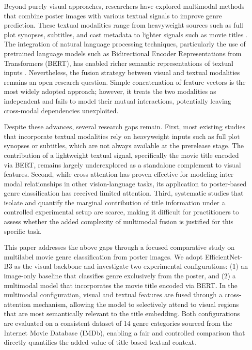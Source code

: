 \documentclass[conference]{IEEEtran}
\begin{document}
Beyond purely visual approaches, researchers have explored multimodal 
methods that combine poster images with various textual signals to 
improve genre prediction. These textual modalities range from 
heavyweight sources such as full plot synopses, subtitles, and cast 
metadata to lighter signals such as movie titles \cite{b5,b6}. 
The integration of natural language processing techniques, particularly 
the use of pretrained language models such as Bidirectional Encoder 
Representations from Transformers (BERT), has enabled richer semantic 
representations of textual inputs \cite{devlin2019}. Nevertheless, the fusion 
strategy between visual and textual modalities remains an open research 
question. Simple concatenation of feature vectors is the most widely 
adopted approach; however, it treats the two modalities as independent 
and fails to model their mutual interactions, potentially leaving 
cross-modal dependencies unexploited.

Despite these advances, several research gaps remain. First, most 
existing studies that incorporate textual modalities rely on heavyweight 
inputs such as full plot synopses or subtitles, which are not always 
available at the prerelease stage. The contribution of a lightweight 
textual signal, specifically the movie title encoded via BERT, 
remains largely underexplored as a standalone complement to visual 
features. Second, while cross-attention has proven effective for 
modeling inter-modal relationships in other vision-language tasks, its 
application to poster-based genre classification has received limited 
attention. Third, systematic studies that isolate and quantify the 
marginal contribution of title information under a controlled 
experimental setup are scarce, making it difficult for practitioners to 
assess whether the added complexity of multimodal fusion is justified 
for this specific task.

This paper addresses the above gaps through a focused comparative study 
on multilabel movie genre classification from poster images. We adopt 
EfficientNet-B3 as the visual backbone and investigate two experimental 
configurations: (1) an image-only baseline that classifies genre 
exclusively from the poster, and (2) a multimodal model that 
incorporates the movie title encoded via BERT. In the multimodal 
configuration, visual and textual features are fused through a 
cross-attention mechanism, allowing the model to selectively attend to 
visual regions that are most semantically relevant to the title 
embedding. Both configurations are evaluated on a consistent dataset 
of 14 genre categories sourced from the Internet Movie Database (IMDb), 
enabling a fair and controlled comparison that directly quantifies the 
added value of title-based textual context.
\end{document}
